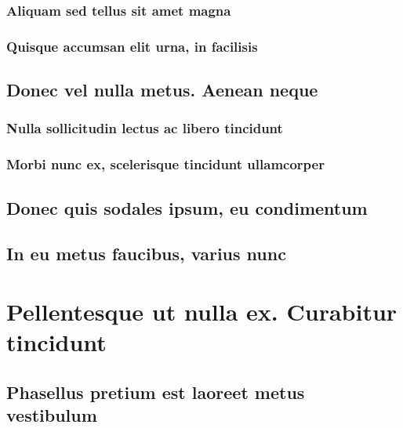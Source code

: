 \documentclass[%
  bachelor,%
  english%
  oneside,%
  debug,%
]{student}
\begin{document}
\lipsum[1-8]

\subsubsection{Aliquam sed tellus sit amet magna}

\lipsum[1-8]

\subsubsection{Quisque accumsan elit urna, in facilisis}

\lipsum[1-8]

\subsection{Donec vel nulla metus. Aenean neque}

\lipsum[1-8]

\subsubsection{Nulla sollicitudin lectus ac libero tincidunt}

\lipsum[1-8]

\subsubsection{Morbi nunc ex, scelerisque tincidunt ullamcorper}

\lipsum[1-8]

\subsection{Donec quis sodales ipsum, eu condimentum}

\lipsum[1-8]

\subsection{In eu metus faucibus, varius nunc}

\lipsum[1-8]

\section{Pellentesque ut nulla ex. Curabitur tincidunt}

\lipsum[1-8]

\subsection{Phasellus pretium est laoreet metus vestibulum}
\end{document}
